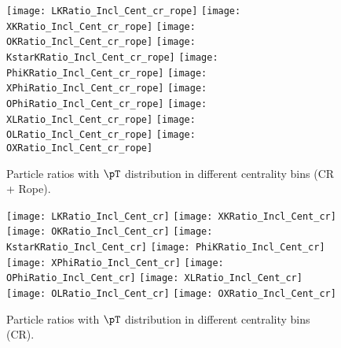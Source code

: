 \begin{figure}[ht]
        \begin{center}
                \texttt{[image: LKRatio\_Incl\_Cent\_cr\_rope]}
                \texttt{[image: XKRatio\_Incl\_Cent\_cr\_rope]}
                \texttt{[image: OKRatio\_Incl\_Cent\_cr\_rope]}
                \texttt{[image: KstarKRatio\_Incl\_Cent\_cr\_rope]}
                \texttt{[image: PhiKRatio\_Incl\_Cent\_cr\_rope]}
                \texttt{[image: XPhiRatio\_Incl\_Cent\_cr\_rope]}
                \texttt{[image: OPhiRatio\_Incl\_Cent\_cr\_rope]}
                \texttt{[image: XLRatio\_Incl\_Cent\_cr\_rope]}
                \texttt{[image: OLRatio\_Incl\_Cent\_cr\_rope]}
                \texttt{[image: OXRatio\_Incl\_Cent\_cr\_rope]}
        \end{center}
	\caption{Particle ratios with $\pT$ distribution in different centrality bins (CR + Rope).}
        \label{fig:InclParRatioCentcrandrope}
\end{figure}
\begin{figure}[ht]
        \begin{center}
                \texttt{[image: LKRatio\_Incl\_Cent\_cr]}
                \texttt{[image: XKRatio\_Incl\_Cent\_cr]}
                \texttt{[image: OKRatio\_Incl\_Cent\_cr]}
                \texttt{[image: KstarKRatio\_Incl\_Cent\_cr]}
                \texttt{[image: PhiKRatio\_Incl\_Cent\_cr]}
                \texttt{[image: XPhiRatio\_Incl\_Cent\_cr]}
                \texttt{[image: OPhiRatio\_Incl\_Cent\_cr]}
                \texttt{[image: XLRatio\_Incl\_Cent\_cr]}
                \texttt{[image: OLRatio\_Incl\_Cent\_cr]}
                \texttt{[image: OXRatio\_Incl\_Cent\_cr]}
        \end{center}
	\caption{Particle ratios with $\pT$ distribution in different centrality bins (CR).}
        \label{fig:InclParRatioCentcr}
\end{figure}
